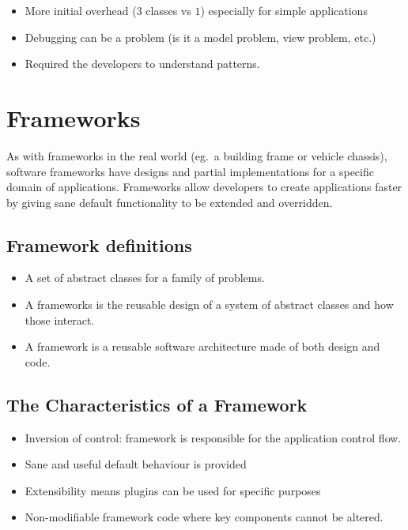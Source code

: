 \begin{itemize}
    \item More initial overhead (\(3\) classes vs \(1\)) especially for simple applications
    \item Debugging can be a problem (is it a model problem, view problem, etc.)
    \item Required the developers to understand patterns.
\end{itemize}

\section{Frameworks}\label{sec:frameworks}

As with frameworks in the real world (eg.\ a building frame or vehicle chassis), software frameworks have designs and partial implementations for a specific domain of applications.
Frameworks allow developers to create applications faster by giving sane default functionality to be extended and overridden.

\subsection{Framework definitions}\label{sub:framework_definitions}

\begin{itemize}
    \item A set of abstract classes for a family of problems.
    \item A frameworks is the reusable design of a system of abstract classes and how those interact.
    \item A framework is a reusable software architecture made of both design and code.
\end{itemize}

\subsection{The Characteristics of a Framework}\label{sub:characteristics}

\begin{itemize}
    \item Inversion of control: framework is responsible for the application control flow.
    \item Sane and useful default behaviour is provided
    \item Extensibility means plugins can be used for specific purposes
    \item Non-modifiable framework code where key components cannot be altered.
\end{itemize}

